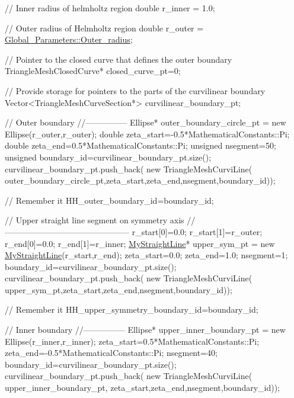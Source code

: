 \begin{DoxyCodeInclude}
  \textcolor{comment}{// Inner radius of helmholtz region}
  \textcolor{keywordtype}{double} r\_inner = 1.0;

  \textcolor{comment}{// Outer radius of Helmholtz region}
  \textcolor{keywordtype}{double} r\_outer = \hyperlink{namespaceGlobal__Parameters_a88ded445ecd7bd89701409e68fd0b900}{Global\_Parameters::Outer\_radius};

  \textcolor{comment}{// Pointer to the closed curve that defines the outer boundary}
  TriangleMeshClosedCurve* closed\_curve\_pt=0;
 
  \textcolor{comment}{// Provide storage for pointers to the parts of the curvilinear boundary}
  Vector<TriangleMeshCurveSection*> curvilinear\_boundary\_pt;

  \textcolor{comment}{// Outer boundary}
  \textcolor{comment}{//---------------}
  Ellipse* outer\_boundary\_circle\_pt = \textcolor{keyword}{new} Ellipse(r\_outer,r\_outer);
  \textcolor{keywordtype}{double} zeta\_start=-0.5*MathematicalConstants::Pi;
  \textcolor{keywordtype}{double} zeta\_end=0.5*MathematicalConstants::Pi;
  \textcolor{keywordtype}{unsigned} nsegment=50;
  \textcolor{keywordtype}{unsigned} boundary\_id=curvilinear\_boundary\_pt.size();
  curvilinear\_boundary\_pt.push\_back(
   \textcolor{keyword}{new} TriangleMeshCurviLine(
    outer\_boundary\_circle\_pt,zeta\_start,zeta\_end,nsegment,boundary\_id));
  
  \textcolor{comment}{// Remember it}
  HH\_outer\_boundary\_id=boundary\_id;
  
  
  \textcolor{comment}{// Upper straight line segment on symmetry axis}
  \textcolor{comment}{//---------------------------------------------}
  r\_start[0]=0.0;
  r\_start[1]=r\_outer;
  r\_end[0]=0.0;
  r\_end[1]=r\_inner;
  \hyperlink{classMyStraightLine}{MyStraightLine}* upper\_sym\_pt = \textcolor{keyword}{new} \hyperlink{classMyStraightLine}{MyStraightLine}(r\_start,r\_end);
  zeta\_start=0.0;
  zeta\_end=1.0;
  nsegment=1;
  boundary\_id=curvilinear\_boundary\_pt.size();
  curvilinear\_boundary\_pt.push\_back(
   \textcolor{keyword}{new} TriangleMeshCurviLine(
    upper\_sym\_pt,zeta\_start,zeta\_end,nsegment,boundary\_id));
                                                        
  \textcolor{comment}{// Remember it}
  HH\_upper\_symmetry\_boundary\_id=boundary\_id;
 
  \textcolor{comment}{// Inner boundary}
  \textcolor{comment}{//---------------}
  Ellipse* upper\_inner\_boundary\_pt = 
   \textcolor{keyword}{new} Ellipse(r\_inner,r\_inner);
  zeta\_start=0.5*MathematicalConstants::Pi;
  zeta\_end=-0.5*MathematicalConstants::Pi;
  nsegment=40;
  boundary\_id=curvilinear\_boundary\_pt.size();
  curvilinear\_boundary\_pt.push\_back(
   \textcolor{keyword}{new} TriangleMeshCurviLine(
    upper\_inner\_boundary\_pt,
    zeta\_start,zeta\_end,nsegment,boundary\_id));


\end{DoxyCodeInclude}
